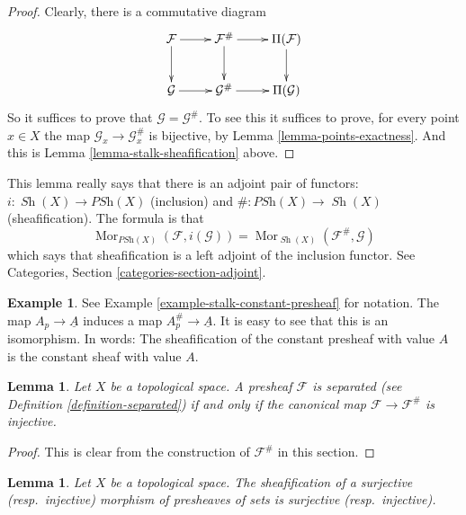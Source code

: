 \documentclass{stacks-project}
\theoremstyle{plain}
\newtheorem{lemma}[subsection]{Lemma}
\theoremstyle{definition}
\newtheorem{example}[subsection]{Example}
\theoremstyle{remark}
\numberwithin{equation}{subsection}
\def\Mor{\mathop{\mathrm{Mor}}\nolimits}
\def\Sh{\mathop{\mathit{Sh}}\nolimits}
\begin{document}
\begin{proof}
Clearly, there is a commutative diagram
$$
\xymatrix{
\mathcal{F} \ar[r] \ar[d] &
\mathcal{F}^\# \ar[r] \ar[d] &
\Pi(\mathcal{F}) \ar[d] \\
\mathcal{G} \ar[r] &
\mathcal{G}^\# \ar[r] &
\Pi(\mathcal{G}) \\
}
$$
So it suffices to prove that $\mathcal{G} = \mathcal{G}^\#$.
To see this it suffices to prove, for every point $x \in X$ the
map $\mathcal{G}_x \to \mathcal{G}^\#_x$ is bijective, by
Lemma \ref{lemma-points-exactness}. And this is
Lemma \ref{lemma-stalk-sheafification} above.
\end{proof}

\noindent
This lemma really says that there is an adjoint pair
of functors: $i : \Sh(X) \to \textit{PSh}(X)$
(inclusion) and $\# : \textit{PSh}(X) \to \Sh(X)$
(sheafification). The formula is that
$$
\Mor_{\textit{PSh}(X)}(\mathcal{F}, i(\mathcal{G}))
=
\Mor_{\Sh(X)}(\mathcal{F}^\#, \mathcal{G})
$$
which says that sheafification is a left adjoint of
the inclusion functor. See Categories, Section
\ref{categories-section-adjoint}.

\begin{example}
\label{example-sheafify-constant}
See Example \ref{example-stalk-constant-presheaf} for notation.
The map $A_p \to \underline{A}$ induces a map
$A_p^\# \to \underline{A}$. It is easy to see that this
is an isomorphism. In words: The sheafification
of the constant presheaf with value $A$ is the
constant sheaf with value $A$.
\end{example}

\begin{lemma}
\label{lemma-separated-presheaf-into-sheaf}
Let $X$ be a topological space.
A presheaf $\mathcal{F}$ is separated (see
Definition \ref{definition-separated}) if and only if
the canonical map $\mathcal{F} \to \mathcal{F}^\#$ is injective.
\end{lemma}

\begin{proof}
This is clear from the construction of $\mathcal{F}^\#$ in this
section.
\end{proof}

\begin{lemma}
\label{lemma-sheafify-epi-mono}
Let $X$ be a topological space. The sheafification of a surjective
(resp.\ injective) morphism of presheaves of sets is surjective
(resp.\ injective).
\end{lemma}
\end{document}
